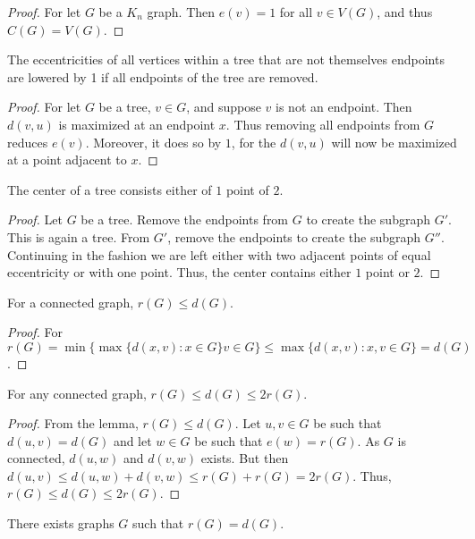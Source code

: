         \begin{proof}
        For let $G$ be a $K_n$ graph. Then $e(v) = 1$ for all $v\in V(G)$, and thus $C(G) = V(G)$.
        \end{proof}
        \begin{corollary}
        The eccentricities of all vertices within a tree that are not themselves endpoints are lowered by 1 if all endpoints of the tree are removed.
        \end{corollary}
        \begin{proof}
        For let $G$ be a tree, $v\in G$, and suppose $v$ is not an endpoint. Then $d(v,u)$ is maximized at an endpoint $x$. Thus removing all endpoints from $G$ reduces $e(v)$. Moreover, it does so by $1$, for the $d(v,u)$ will now be maximized at a point adjacent to $x$.
        \end{proof}
        \begin{theorem}
        The center of a tree consists either of $1$ point of $2$.
        \end{theorem}
        \begin{proof}
        Let $G$ be a tree. Remove the endpoints from $G$ to create the subgraph $G'$. This is again a tree. From $G'$, remove the endpoints to create the subgraph $G''$. Continuing in the fashion we are left either with two adjacent points of equal eccentricity or with one point. Thus, the center contains either $1$ point or $2$.
        \end{proof}
        \begin{lemma}
        For a connected graph, $r(G) \leq d(G)$.
        \end{lemma}
        \begin{proof}
        For $r(G) = \min\{\max\{d(x,v):x\in G\} v\in G\} \leq \max\{d(x,v):x,v\in G\}=d(G)$.
        \end{proof}
        \begin{theorem}
        For any connected graph, $r(G) \leq d(G) \leq 2r(G)$.
        \end{theorem}
        \begin{proof}
        From the lemma, $r(G) \leq d(G)$. Let $u,v\in G$ be such that $d(u,v)=d(G)$ and let $w\in G$ be such that $e(w) = r(G)$. As $G$ is connected, $d(u,w)$ and $d(v,w)$ exists. But then $d(u,v)\leq d(u,w)+d(v,w) \leq r(G)+r(G)=2r(G)$. Thus, $r(G)\leq d(G)\leq 2r(G)$.
        \end{proof}
        \begin{corollary}
        There exists graphs $G$ such that $r(G) = d(G)$.
        \end{corollary}
